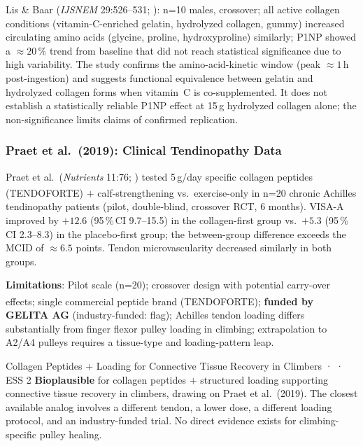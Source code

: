 Lis \& Baar (\textit{IJSNEM} 29:526--531; \cite{LB19}): n=10 males, crossover; all active collagen conditions (vitamin-C-enriched gelatin, hydrolyzed collagen, gummy) increased circulating amino acids (glycine, proline, hydroxyproline) similarly; P1NP showed a ${\approx}20\,\%$ trend from baseline that did not reach statistical significance due to high variability. The study confirms the amino-acid-kinetic window (peak ${\approx}1$\,h post-ingestion) and suggests functional equivalence between gelatin and hydrolyzed collagen forms when vitamin~C is co-supplemented. It does not establish a statistically reliable P1NP effect at 15\,g hydrolyzed collagen alone; the non-significance limits claims of confirmed replication.

\subsubsection{Praet et al.\ (2019): Clinical Tendinopathy Data}

Praet et al.\ (\textit{Nutrients} 11:76; \cite{PPW+19}) tested 5\,g/day specific collagen peptides (TENDOFORTE\textsuperscript{\textregistered}) $+$ calf-strengthening vs.\ exercise-only in n=20 chronic Achilles tendinopathy patients (pilot, double-blind, crossover RCT, 6 months). VISA-A improved by $+12.6$ (95\,\%\,CI 9.7--15.5) in the collagen-first group vs.\ $+5.3$ (95\,\%\,CI 2.3--8.3) in the placebo-first group; the between-group difference exceeds the MCID of ${\approx}6.5$ points. Tendon microvascularity decreased similarly in both groups.

\textbf{Limitations}: Pilot scale (n=20); crossover design with potential carry-over effects; single commercial peptide brand (TENDOFORTE\textsuperscript{\textregistered}); \textbf{funded by GELITA AG} (industry-funded: flag); Achilles tendon loading differs substantially from finger flexor pulley loading in climbing; extrapolation to A2/A4 pulleys requires a tissue-type and loading-pattern leap.

\begin{bioplausbox}{Collagen Peptides + Loading for Connective Tissue Recovery in Climbers · \bioplausible · ESS 2}
\textbf{Bioplausible} for collagen peptides $+$ structured loading supporting connective tissue recovery in climbers, drawing on Praet et al.\ (2019). The closest available analog involves a different tendon, a lower dose, a different loading protocol, and an industry-funded trial. No direct evidence exists for climbing-specific pulley healing.
\end{bioplausbox}

